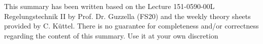 



\maketitle
\begin{center}
    This summary has been written based on the Lecture 151-0590-00L Regelungstechnik II by Prof. Dr. Guzzella (FS20) and the weekly theory sheets provided by C. Küttel. There is no guarantee for completeness and/or correctness regarding the content of this summary. Use it at your own discretion
\end{center}
\newpage

\begin{center}
    \begin{multicols*}{3}
        \tableofcontents
    \end{multicols*}
\end{center}

